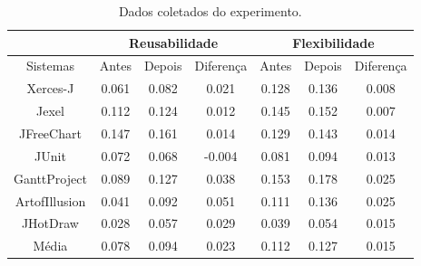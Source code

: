 \begin{table}[h]
\centering
\caption{Dados coletados do experimento.}
\label{tab:dados_coletados_experimento_1}
\begin{tabular}{c|l|l|l|l|l|l|}
\cline{2-7}
\multicolumn{1}{l|}{}               & \multicolumn{3}{c|}{Reusabilidade}             & \multicolumn{3}{c|}{Flexibilidade} \\ \hline
\multicolumn{1}{|c|}{Sistemas}      & Antes         & Depois        & Diferença      & Antes     & Depois    & Diferença  \\ \hline
\multicolumn{1}{|c|}{Xerces-J}      & \multicolumn{1}{c|}{0.061}          & \multicolumn{1}{c|}{0.082}          & \multicolumn{1}{c|}{0.021} & \multicolumn{1}{c|}{0.128}      & \multicolumn{1}{c|}{0.136}      &\multicolumn{1}{c|}{0.008}\\ \hline
\multicolumn{1}{|c|}{Jexel}         & \multicolumn{1}{c|}{0.112}& \multicolumn{1}{c|}{0.124} & \multicolumn{1}{c|}{0.012} & \multicolumn{1}{c|}{0.145}      & \multicolumn{1}{c|}{0.152}      &\multicolumn{1}{c|}{0.007}\\ \hline
\multicolumn{1}{|c|}{JFreeChart}    & \multicolumn{1}{c|}{0.147}& \multicolumn{1}{c|}{0.161}& \multicolumn{1}{c|}{0.014} & \multicolumn{1}{c|}{0.129}      & \multicolumn{1}{c|}{0.143}      & \multicolumn{1}{c|}{0.014} \\ \hline
\multicolumn{1}{|c|}{JUnit}        & \multicolumn{1}{c|}{0.072}& \multicolumn{1}{c|}{0.068}& \multicolumn{1}{c|}{-0.004} & \multicolumn{1}{c|}{0.081}      & \multicolumn{1}{c|}{0.094}      & \multicolumn{1}{c|}{0.013}  \\ \hline
\multicolumn{1}{|c|}{GanttProject}  & \multicolumn{1}{c|}{0.089}& \multicolumn{1}{c|}{0.127}          & \multicolumn{1}{c|}{0.038} & \multicolumn{1}{c|}{0.153}      & \multicolumn{1}{c|}{0.178}      &  \multicolumn{1}{c|}{0.025} \\ \hline
\multicolumn{1}{|c|}{ArtofIllusion} & \multicolumn{1}{c|}{0.041}          & \multicolumn{1}{c|}{0.092}          & \multicolumn{1}{c|}{0.051} & \multicolumn{1}{c|}{0.111}      & \multicolumn{1}{c|}{0.136}      & \multicolumn{1}{c|}{0.025} \\ \hline
\multicolumn{1}{|c|}{JHotDraw}      & \multicolumn{1}{c|}{0.028}          & \multicolumn{1}{c|}{0.057}          & \multicolumn{1}{c|}{0.029} & \multicolumn{1}{c|}{0.039}      & \multicolumn{1}{c|}{0.054}      & \multicolumn{1}{c|}{0.015}\\ \hline
\multicolumn{1}{|c|}{Média}         & \multicolumn{1}{c|}{0.078}         & \multicolumn{1}{c|}{0.094}         & \multicolumn{1}{c|}{0.023} & \multicolumn{1}{c|}{0.112}     & \multicolumn{1}{c|}{0.127}     & \multicolumn{1}{c|}{0.015} \\ \hline

\end{tabular}
\end{table}
